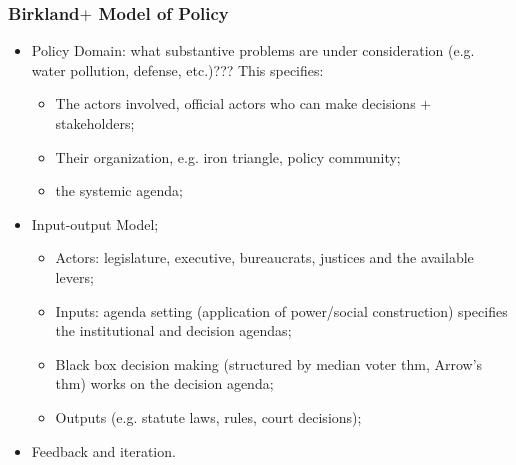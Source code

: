 \documentclass[aspectratio=169]{beamer}
\theoremstyle{principle}
\begin{document}
\begin{frame}
\frametitle{Birkland$+$ Model of Policy}
\begin{itemize}
\item Policy Domain: what substantive problems are under consideration (e.g. water pollution, defense, etc.)???  This specifies:
\begin{itemize}
\item The actors involved, official actors who can make decisions $+$ stakeholders; 
\item Their organization, e.g. iron triangle, policy community;
\item the systemic agenda; 
\end{itemize}
\bigskip
\item \color{black}Input-output Model;
\begin{itemize}
\item Actors: legislature, executive, bureaucrats, justices and the available levers;
\item Inputs: agenda setting (application of power/social construction) specifies the institutional and decision agendas;
\item Black box decision making (structured by median voter thm, Arrow's thm) works on the decision agenda;
\item Outputs (e.g. statute laws, rules, court decisions);
\end{itemize}
\bigskip
\item Feedback and iteration.
\end{itemize}
\end{frame}
\end{document}
